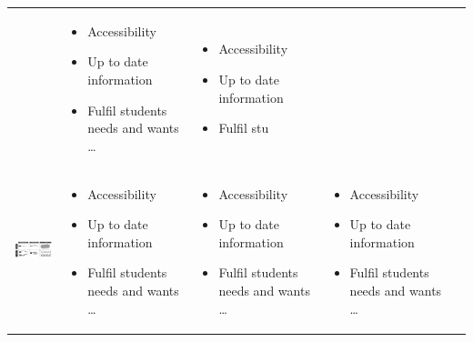 \documentclass{article}
\begin{document}
\begin{table}[htb]
\begin{tabular}{  c | m{3cm} | m{3cm} | m{3cm} | m{1cm} }
    & 

      \begin{itemize}
        \item Accessibility
        \item Up to date information
        \item Fulfil students needs and wants \ldots
      \end{itemize}
    &

	 \begin{itemize}
        \item Accessibility
        \item Up to date information
        \item Fulfil stu
	 \end{itemize} \\

 \begin{minipage}{.3\textwidth}
      \includegraphics[width=\linewidth, height=20mm]{cilia}
    \end{minipage}
    &
     \begin{itemize}
        \item Accessibility
        \item Up to date information
        \item Fulfil students needs and wants \ldots
      \end{itemize}
    
    & 

      \begin{itemize}
        \item Accessibility
        \item Up to date information
        \item Fulfil students needs and wants \ldots
      \end{itemize}
    &

	 \begin{itemize}
        \item Accessibility
        \item Up to date information
        \item Fulfil students needs and wants \ldots
      \end{itemize} \\


\end{tabular}
\end{table}
\end{document}

